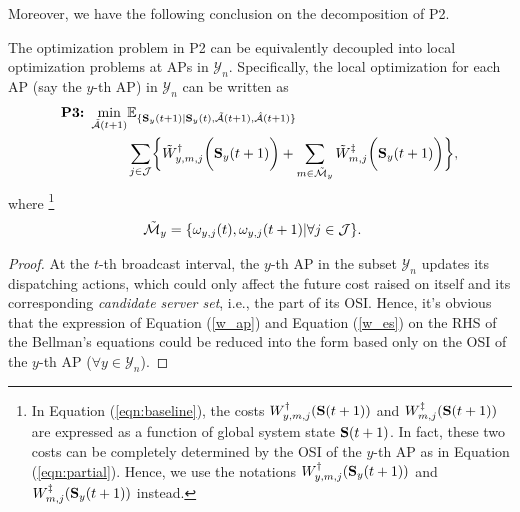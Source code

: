 Moreover, we have the following conclusion on the decomposition of P2.
\begin{lemma}[]
    The optimization problem in P2 can be equivalently decoupled into local optimization problems at APs in $\mathcal{Y}_n$.
    Specifically, {the local optimization for each AP (say the $y$-th AP) in $\mathcal{Y}_n$ can be written as}
    \begin{align}
        \textbf{P3:}~
        \min_{ \tilde{\mathcal{A}}(t+1) }
        &\mathbb{E}_{\set{ \Stat_{y}(t+1)|\Stat_{y}(t), \tilde{\mathcal{A}}(t+1),\hat{\mathcal{A}}(t+1) }}
        \nonumber\\
        &\sum_{j\in\jSpace}
        \Brace{
            \tilde{W}^{\AP}_{y,m,j}\Paren{\Stat_{y}(t+1)}
            + \sum_{m\in\tilde{\esSet}_{y}} \tilde{W}^{\ES}_{m,j}\Paren{\Stat_{y}(t+1)}
        },
        \label{eqn:partial}
    \end{align}
    where \footnote{In Equation (\ref{eqn:baseline}), the costs $W^{\dagger}_{y,m,j}(\mathbf{S}(t+1))$ and $W^{\ddagger}_{m,j}(\mathbf{S}(t+1))$ are expressed as a function of global system state $\mathbf{S}(t+1)$. In fact, these two costs can be completely determined by the OSI of the $y$-th AP as in Equation (\ref{eqn:partial}). Hence, we use the notations $W^{\dagger}_{y,m,j}(\mathbf{S}_y(t+1))$ and $W^{\ddagger}_{m,j}(\mathbf{S}_y(t+1))$ instead.}
    \begin{align*}
       \tilde{\mathcal{M}}_{y} &= \{\omega_{y,j}(t), \omega_{y,j}(t+1) | \forall j\in\mathcal{J}\}.
    \end{align*}
    \label{lemma:w_partial}
\end{lemma}
\begin{proof}
    At the $t$-th broadcast interval, the $y$-th AP in the subset $\mathcal{Y}_{n}$ updates its dispatching actions, which could only affect the future cost raised on itself and its corresponding \emph{candidate server set}, i.e., the part of its OSI.
    Hence, it's obvious that the expression of Equation (\ref{w_ap}) and Equation (\ref{w_es}) on the RHS of the Bellman's equations could be reduced into the form based only on the OSI of the $y$-th AP ($\forall y\in\mathcal{Y}_{n}$).
\end{proof}

